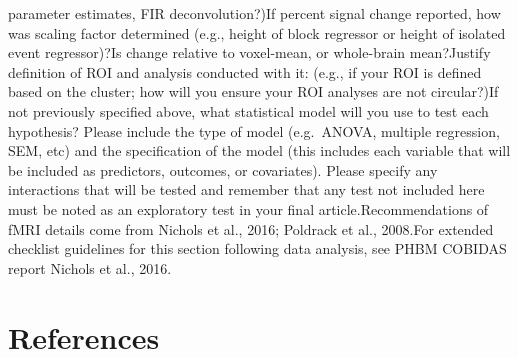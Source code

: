 \documentclass[]{article}
\begin{document}
parameter estimates, FIR deconvolution?)If percent signal change
reported, how was scaling factor determined (e.g., height of block
regressor or height of isolated event regressor)?Is change relative to
voxel-mean, or whole-brain mean?Justify definition of ROI and analysis
conducted with it: (e.g., if your ROI is defined based on the cluster;
how will you ensure your ROI analyses are not circular?)If not
previously specified above, what statistical model will you use to test
each hypothesis? Please include the type of model (e.g.~ANOVA, multiple
regression, SEM, etc) and the specification of the model (this includes
each variable that will be included as predictors, outcomes, or
covariates). Please specify any interactions that will be tested and
remember that any test not included here must be noted as an exploratory
test in your final article.Recommendations of fMRI details come from
Nichols et al., 2016; Poldrack et al., 2008.For extended checklist
guidelines for this section following data analysis, see PHBM COBIDAS
report Nichols et al., 2016.

\hypertarget{references}{%
\section{References}\label{references}}

\hypertarget{section}{%
\subsection{}\label{section}}

\vspace{-2pc}
\setlength{\parindent}{-0.5in}
\setlength{\leftskip}{-1in}
\setlength{\parskip}{8pt}

\noindent
\end{document}
